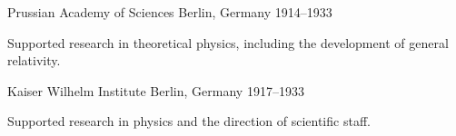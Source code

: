 
\begin{cventries}

    {Prussian Academy of Sciences} %
    {Berlin, Germany} %
    {1914--1933} %
    {
      \begin{cvitems}
        \item {Supported research in theoretical physics, including
        the development of general relativity.}
      \end{cvitems}
    }


    {Kaiser Wilhelm Institute} %
    {Berlin, Germany} %
    {1917--1933} %
    {
      \begin{cvitems}
        \item {Supported research in physics and the direction of scientific 
        staff.}
      \end{cvitems}
    }

\end{cventries}
